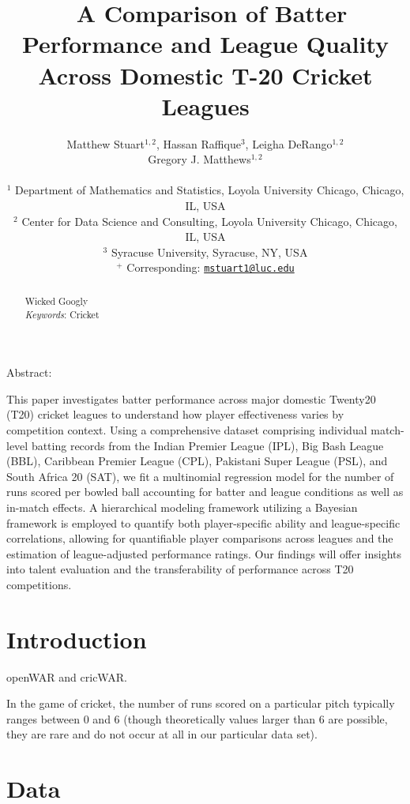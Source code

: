 \documentclass[
  12pt,
]{article}
\title{~\Large A Comparison of Batter Performance and League Quality
Across Domestic T-20 Cricket Leagues}
\author{\large Matthew Stuart\(^{1,2}\), Hassan Raffique\(^{3}\), Leigha
DeRango\(^{1,2}\)\\
\large Gregory J. Matthews\(^{1,2}\)\\
\vspace{-1.1mm}\\
\large \(^1\) Department of Mathematics and Statistics, Loyola
University Chicago, Chicago, IL, USA \vspace{-1.1mm}\\
\large \(^2\) Center for Data Science and Consulting, Loyola University
Chicago, Chicago, IL, USA \vspace{-1.1mm}\\
\large \(^3\) Syracuse University, Syracuse, NY, USA \vspace{-1.1mm}\\
\large \(^+\) Corresponding:
\href{mailto:mstuart1@luc.edu}{\nolinkurl{mstuart1@luc.edu}}
\vspace{-1.1mm}}
\date{}
\begin{document}
\maketitle
\begin{abstract}
Wicked Googly \vspace{2mm}\\
\emph{Keywords}: Cricket
\end{abstract}

\newcommand{\iid}{\overset{iid}{\sim}}

Abstract:

This paper investigates batter performance across major domestic
Twenty20 (T20) cricket leagues to understand how player effectiveness
varies by competition context. Using a comprehensive dataset comprising
individual match-level batting records from the Indian Premier League
(IPL), Big Bash League (BBL), Caribbean Premier League (CPL), Pakistani
Super League (PSL), and South Africa 20 (SAT), we fit a multinomial
regression model for the number of runs scored per bowled ball
accounting for batter and league conditions as well as in-match effects.
A hierarchical modeling framework utilizing a Bayesian framework is
employed to quantify both player-specific ability and league-specific
correlations, allowing for quantifiable player comparisons across
leagues and the estimation of league-adjusted performance ratings. Our
findings will offer insights into talent evaluation and the
transferability of performance across T20 competitions.

\newpage

\hypertarget{sec:intro}{%
\section{Introduction}\label{sec:intro}}

openWAR and cricWAR.

In the game of cricket, the number of runs scored on a particular pitch
typically ranges between 0 and 6 (though theoretically values larger
than 6 are possible, they are rare and do not occur at all in our
particular data set).

\hypertarget{sec:data}{%
\section{Data}\label{sec:data}}
\end{document}
